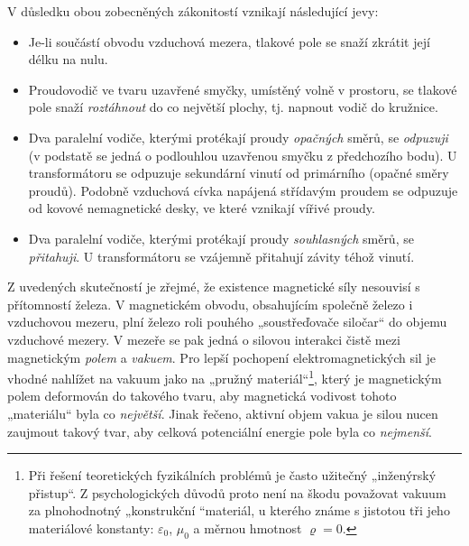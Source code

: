       V důsledku obou zobecněných zákonitostí vznikají následující jevy:
      \begin{itemize}[noitemsep]
        \item Je-li součástí obvodu vzduchová mezera, tlakové pole se snaží zkrátit její délku na
              nulu.
        \item Proudovodič ve tvaru uzavřené smyčky, umístěný volně v prostoru, se tlakové pole   
              snaží \emph{roztáhnout} do co největší plochy, tj. napnout vodič do kružnice.
        \item Dva paralelní vodiče, kterými protékají proudy \emph{opačných} směrů, se
              \emph{odpuzuji} (v podstatě se jedná o podlouhlou uzavřenou smyčku z předchozího
              bodu). U transformátoru se odpuzuje sekundární vinutí od primárního (opačné směry
              proudů). Podobně vzduchová cívka napájená střídavým proudem se odpuzuje od kovové
              nemagnetické desky, ve které vznikají vířivé proudy.
        \item Dva paralelní vodiče, kterými protékají proudy \emph{souhlasných} směrů, se 
              \emph{přitahuji}. U transformátoru se vzájemně přitahují závity téhož vinutí.
      \end{itemize}
      
      Z uvedených skutečností je zřejmé, že existence magnetické síly nesouvisí s přítomností
      železa. V magnetickém obvodu, obsahujícím společně železo i vzduchovou mezeru, plní železo
      roli pouhého „soustřeďovače siločar“ do objemu vzduchové mezery. V mezeře se pak jedná o
      silovou interakci čistě mezi magnetickým \emph{polem} a \emph{vakuem}. Pro lepší pochopení
      elektromagnetických sil je vhodné nahlížet na vakuum jako na „pružný materiál“\footnote{Při
      řešení teoretických fyzikálních problémů je často užitečný „inženýrský přistup“. Z
      psychologických důvodů proto není na škodu považovat vakuum za plnohodnotný „konstrukční
      “materiál, u kterého známe s jistotou tři jeho materiálové konstanty: \(\varepsilon_0\),
      \(\mu_0\) a měrnou hmotnost \(\varrho = 0\).}, který je magnetickým polem deformován do
      takového tvaru, aby magnetická vodivost tohoto „materiálu“ byla co \emph{největší}. Jinak
      řečeno, aktivní objem vakua je silou nucen zaujmout takový tvar, aby celková potenciální
      energie pole byla co \emph{nejmenší}.
      
